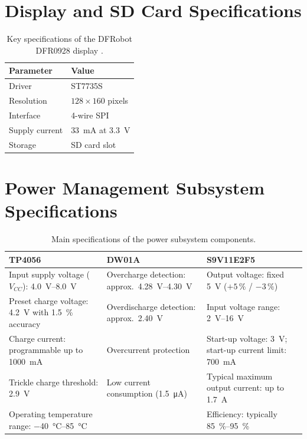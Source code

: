 \section{Display and SD Card Specifications}
\label{app:display_sd_specs}

\begin{table}[H]
  \centering
  \caption{Key specifications of the DFRobot DFR0928 display
    \cite{dfrobot_dfr0928}.}
  \label{tab:hw_display_specs}
  \begin{tabular}{@{}ll@{}}
    \toprule
    \textbf{Parameter} & \textbf{Value} \\
    \midrule
    Driver         & ST7735S \\
    Resolution     & $128 \times 160$ pixels \\
    Interface      & 4-wire SPI \\
    Supply current & \SI{33}{\milli\ampere} at \SI{3.3}{\volt} \\
    Storage        & SD card slot \\
    \bottomrule
  \end{tabular}
\end{table}

\section{Power Management Subsystem Specifications}
\label{app:power_specs}

\begin{table}[H]
  \centering
  \caption{Main specifications of the power subsystem components.}
  \label{tab:hw_power_specs}
  \small
  \begin{tabularx}{\textwidth}{@{}
      >{\raggedright\arraybackslash}X
      >{\raggedright\arraybackslash}X
      >{\raggedright\arraybackslash}X@{}}
    \toprule
    \textbf{TP4056} \cite{tp4056_ds} & \textbf{DW01A} \cite{dw01a_ds}
      & \textbf{S9V11E2F5} \cite{pololu_s9v11e2f5} \\
    \midrule
    Input supply voltage ($V_{CC}$): \SIrange{4.0}{8.0}{\volt}
      & Overcharge detection: approx.\ \SIrange{4.28}{4.30}{\volt}
      & Output voltage: fixed \SI{5}{\volt} ($+5\,\%$ / $-3\,\%$) \\
    \addlinespace
    Preset charge voltage: \SI{4.2}{\volt} with \SI{1.5}{\percent} accuracy
      & Overdischarge detection: approx.\ \SI{2.40}{\volt}
      & Input voltage range: \SIrange{2}{16}{\volt} \\
    \addlinespace
    Charge current: programmable up to \SI{1000}{\milli\ampere}
      & Overcurrent protection
      & Start-up voltage: \SI{3}{\volt}; start-up current limit:
        \SI{700}{\milli\ampere} \\
    \addlinespace
    Trickle charge threshold: \SI{2.9}{\volt}
      & Low current consumption (\SI{1.5}{\micro\ampere})
      & Typical maximum output current: up to \SI{1.7}{\ampere} \\
    \addlinespace
    Operating temperature range: \SIrange{-40}{85}{\celsius}
      &
      & Efficiency: typically \SIrange{85}{95}{\percent} \\
    \bottomrule
  \end{tabularx}
\end{table}

